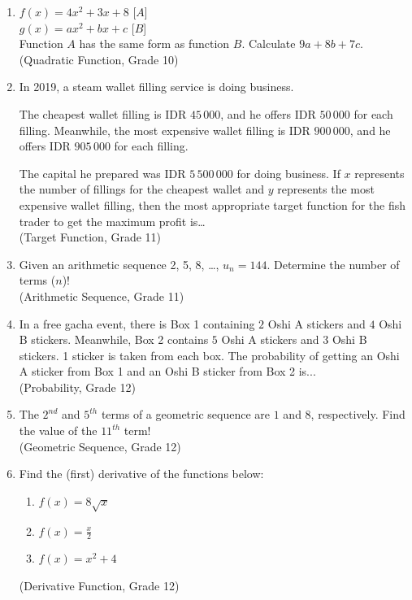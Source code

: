 \documentclass[12pt]{article}
\begin{document}
\begin{enumerate}
  \item $f(x) = 4x^2 + 3x + 8$ [$A$] \\
        $g(x) = ax^2 + bx + c$ [$B$] \\
        Function $A$ has the same form as function $B$. Calculate $9a+8b+7c$. \\
        (Quadratic Function, Grade 10)

  \item In 2019, a steam wallet filling service is doing business.

        The cheapest wallet filling is IDR $45\,000$, and he offers IDR $50\,000$ for each filling. Meanwhile, the most expensive wallet filling is IDR $900\,000$, and he offers IDR $905\,000$ for each filling.

        The capital he prepared was IDR $5\,500\,000$ for doing business. If $x$ represents the number of fillings for the cheapest wallet and $y$ represents the most expensive wallet filling, then the most appropriate target function for the fish trader to get the maximum profit is\ldots \\
        (Target Function, Grade 11)

  \item Given an arithmetic sequence 2, 5, 8, \ldots, $u_n = 144$. Determine the number of terms ($n$)! \\
        (Arithmetic Sequence, Grade 11)

  \item In a free gacha event, there is Box 1 containing $2$ Oshi A stickers and $4$ Oshi B stickers. Meanwhile, Box 2 contains $5$ Oshi A stickers and $3$ Oshi B stickers. 1 sticker is taken from each box. The probability of getting an Oshi A sticker from Box 1 and an Oshi B sticker from Box 2 is... \\
        (Probability, Grade 12)

  \item The $2^{nd}$ and $5^{th}$ terms of a geometric sequence are $1$ and $8$, respectively. Find the value of the $11^{th}$ term! \\
        (Geometric Sequence, Grade 12)

  \item Find the (first) derivative of the functions below:
        \begin{enumerate}[label=\alph*)]
          \item $f(x) = 8 \sqrt{x}$
          \item $f(x) = \frac{x}{2} $
          \item $f(x) = x^2 + 4$
        \end{enumerate}
        (Derivative Function, Grade 12)
\end{enumerate}
\end{document}
